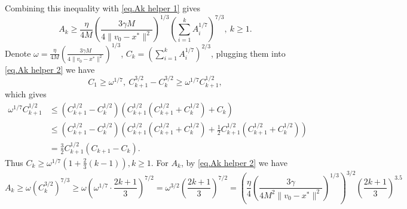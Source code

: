 \documentclass[moor,sglanonrev]{informs4}
\begin{document}
\begin{APPENDICES}
    Combining this inequality with \eqref{eq.Ak helper 1} gives
    \begin{equation}
        \label{eq.Ak helper 2}
        A_k \geq \frac{\eta}{4M}\left (\frac{3\gamma M}{4\|v_0-x^*\|^2}\right)^{1/3} \left(\sum_{i=1}^{k} A_{i}^{1 / 7}\right)^{7 / 3}, \ k\geq 1.
    \end{equation}
    Denote $\omega = \frac{\eta}{4M}\left (\frac{3\gamma M}{4\|v_0-x^*\|^2}\right)^{1/3}$, $C_k =\left(\sum_{i=1}^k A_i^{1 / 7}\right)^{2 / 3}$, plugging them into \eqref{eq.Ak helper 2} we have
    \begin{equation*}
        C_1\geq\omega^{1/7},\ C_{k+1}^{3 / 2}-C_k^{3 / 2} \geq \omega^{1 / 7} C_{k+1}^{1 / 2},
    \end{equation*}
    which gives
    \begin{equation*}
        \begin{aligned}
            \omega^{1 / 7} C_{k+1}^{1 / 2} & \leq\left(C_{k+1}^{1 / 2}-C_k^{1 / 2}\right)\left(C_{k+1}^{1 / 2}\left(C_{k+1}^{1 / 2}+C_k^{1 / 2}\right)+C_k\right)                                                                 \\
                                           & \leq\left(C_{k+1}^{1 / 2}-C_k^{1 / 2}\right)\left(C_{k+1}^{1 / 2}\left(C_{k+1}^{1 / 2}+C_k^{1 / 2}\right)+\frac{1}{2} C_{k+1}^{1 / 2}\left(C_{k+1}^{1 / 2}+C_k^{1 / 2}\right)\right) \\
                                           & =\frac{3}{2} C_{k+1}^{1 / 2}\left(C_{k+1}-C_k\right).
        \end{aligned}
    \end{equation*}
    Thus $C_k \geq \omega^{1 / 7}\left(1+\frac{2}{3}(k-1)\right), k \geq 1$. For $A_k$, by \eqref{eq.Ak helper 2} we have
    \begin{equation*}
        A_k  \geq \omega\left(C_k^{3 / 2}\right)^{7 / 3} \geq \omega\left(\omega^{1 / 7} \cdot \frac{2 k+1}{3}\right)^{7 / 2}=\omega^{3 / 2}\left(\frac{2 k+1}{3}\right)^{7 / 2}
        =\left(\frac{\eta}{4}\left (\frac{3\gamma}{4M^2\|v_0-x^*\|^2}\right)^{1/3}\right)^{3 / 2}\left(\frac{2 k+1}{3}\right)^{3.5}
    \end{equation*}
    \Halmos \endproof

\end{APPENDICES}
\end{document}
